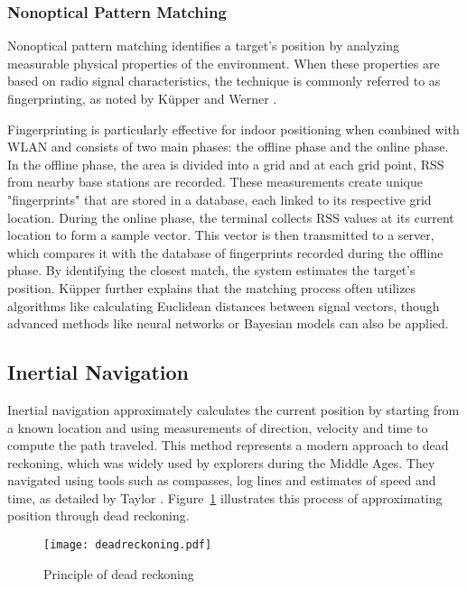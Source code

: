 \subsubsection{Nonoptical Pattern Matching}
Nonoptical pattern matching identifies a target's position by analyzing measurable physical properties of the environment. 
When these properties are based on radio signal characteristics, the technique is commonly referred to as fingerprinting, as noted by Küpper \cite{kupper2005location} and Werner \cite{werner2014indoor}.

Fingerprinting is particularly effective for indoor positioning when combined with WLAN and consists of two main phases: the offline phase and the online phase. 
In the offline phase, the area is divided into a grid and at each grid point, \ac{RSS} from nearby base stations are recorded. 
These measurements create unique "fingerprints" that are stored in a database, each linked to its respective grid location.
During the online phase, the terminal collects \acs{RSS} values at its current location to form a sample vector. This vector is then transmitted to a server, which compares it with the database of fingerprints recorded during the offline phase. 
By identifying the closest match, the system estimates the target's position.
K\"upper \cite{kupper2005location} further explains that the matching process often utilizes algorithms like calculating Euclidean distances between signal vectors, though advanced methods like neural networks or Bayesian models can also be applied.

\subsection{Inertial Navigation}
Inertial navigation approximately calculates the current position by starting from a known location and using measurements of direction, velocity and time to compute the path traveled.
This method represents a modern approach to dead reckoning, which was widely used by explorers during the Middle Ages. 
They navigated using tools such as compasses, log lines and estimates of speed and time, as detailed by Taylor \cite{taylor1950deadreckoning}. 
Figure~\ref{fig:deadreckoning} illustrates this process of approximating position through dead reckoning.

\begin{figure}[htbp] 
    \centering \texttt{[image: deadreckoning.pdf]} 
    \caption{Principle of dead reckoning \cite{wei2022positioning}} 
    \label{fig:deadreckoning} 
\end{figure}

